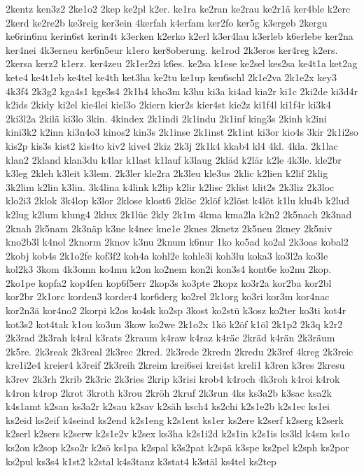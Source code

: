 {2kentz
ken3z2
2ke1o2
2kep
ke2pl
k2er.
ke1ra
ke2ran
ke2rau
ke2r1ä
ker4ble
k2erc
2kerd
ke2re2b
ke3reig
ker3ein
4kerfah
k4erfam
ker2fo
ker5g
k3ergeb
2kergu
ke6rin6nu
kerin6st
kerin4t
k3erken
k2erko
k2erl
k3er4lau
k3erleb
k6erlebe
ker2na
ker4nei
4k3erneu
ker6n5eur
k1ero
ker8oberung.
ke1rod
2k3eros
ker4reg
k2ers.
2kersa
kerz2
k1erz.
ker4zeu
2k1er2zi
k6es.
ke2sa
k1ese
ke2sel
kes2sa
ke4t1a
ket2ag
kete4
ke4t1eb
ke4tel
ke4th
ket3ha
ke2tu
ke1up
keu6schl
2k1e2va
2k1e2x
key3
4k3f4
2k3g2
kga4s1
kge3s4
2k1h4
kho3m
k3hu
ki3a
ki4ad
kia2r
ki1c
2ki2de
ki3d4r
k2ids
2kidy
ki2el
kie4lei
kiel3o
2kiern
kier2s
kier4st
kie2z
ki1f4l
ki1f4r
ki3k4
2ki3l2a
2kilä
ki3lo
3kin.
4kindex
2k1indi
2k1indu
2k1inf
king3s
2kinh
k2ini
kini3k2
k2inn
ki3n4o3
kinos2
kin3s
2k1inse
2k1inst
2k1int
ki3or
kio4s
3kir
2k1i2so
kis2p
kis3s
kist2
kis4to
kiv2
kive4
2kiz
2k3j
2k1k4
kkab4
kl4
4kl.
4kla.
2k1lac
klan2
2kland
klan3du
k4lar
k1last
k1lauf
k3laug
2kläd
k2lär
k2le
4k3le.
kle2br
k3leg
2kleh
k3leit
k3lem.
2k3ler
kle2ra
2k3leu
kle3us
2klic
k2lien
k2lif
2klig
3k2lim
k2lin
k3lin.
3k4lina
k4link
k2lip
k2lir
k2lisc
2klist
klit2s
2k3liz
2k3loc
klo2i3
2klok
3k4lop
k3lor
2klose
klost6
2klöc
2klöf
k2löst
k4löt
k1lu
klu4b
k2lud
k2lug
k2lum
klung4
2klux
2k1lüc
2kly
2k1m
4kma
kma2la
k2n2
2k5nach
2k3nad
2knah
2k5nam
2k3näp
k3ne
k4nec
kne1e
2knes
2knetz
2k5neu
2kney
2k5niv
kno2b3l
k4nol
2knorm
2knov
k3nu
2knum
k6nur
1ko
ko5ad
ko2al
2k3oas
kobal2
2kobj
kob4s
2k1o2fe
kof3f2
koh4a
kohl2e
kohle3i
koh3lu
koka3
ko3l2a
ko3le
kol2k3
3kom
4k3omn
ko4mu
k2on
ko2nem
kon2i
kon3s4
kont6e
ko2nu
2kop.
2ko1pe
kopfa2
kop4fen
kop6f5err
2kop3s
ko3pte
2kopz
ko3r2a
kor2ba
kor2bl
kor2br
2k1orc
korden3
korder4
kor6derg
ko2rel
2k1org
ko3ri
kor3m
kor4nac
kor2n3ä
kor4no2
2korpi
k2os
ko4sk
ko2sp
3kost
ko2stü
k3osz
ko2ter
ko3ti
kot4r
kot3s2
kot4tak
k1ou
ko3un
3kow
ko2we
2k1o2x
1kö
k2öf
k1öl
2k1p2
2k3q
k2r2
2k3rad
2k3rah
k4ral
k3rats
2kraum
k4raw
k4raz
k4räc
2kräd
k4rän
2k3räum
2k5re.
2k3reak
2k3real
2k3rec
2kred.
2k3rede
2kredn
2kredu
2k3ref
4kreg
2k3reic
kre1i2e4
kreier4
k3reif
2k3reih
2kreim
krei6sei
krei4st
kreli1
k3ren
k3res
2kresu
k3rev
2k3rh
2krib
2k3ric
2k3ries
2krip
k3risi
krob4
k4roch
4k3roh
k4roi
k4rok
k4ron
k4rop
2krot
3kroth
k3rou
2kröh
2kruf
2k3run
4ks
ks3a2b
k3sac
ksa2k
k4s1amt
k2san
ks3a2r
k2sau
k2sav
k2säh
ksch4
ks2chi
k2s1e2b
k2s1ec
ks1ei
ks2eid
ks2eif
k4seind
ks2end
k2s1eng
k2s1ent
ks1er
ks2ere
k2serf
k2serg
k2serk
k2serl
k2sers
k2serw
k2s1e2v
k2sex
ks3ha
k2s1i2d
k2s1in
k2s1is
ks3kl
k4sm
ks1o
ks2on
k2sop
k2so2r
k2sö
ks1pa
k2spal
k3s2pat
k2spä
k3spe
ks2pel
k2sph
ks2por
ks2pul
ks3s4
k1st2
k2stal
k4s3tanz
k3stat4
k3stäl
ks4tel
ks2tep
}
